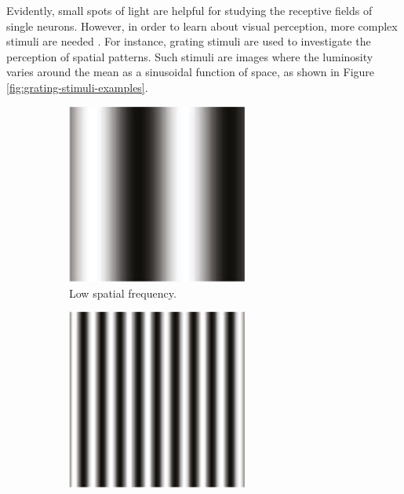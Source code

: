 Evidently, small spots of light are helpful for studying the receptive fields of single neurons. However, in order to learn about visual perception, more complex stimuli are needed \cite{KandelBook2003:26}. For instance, grating stimuli are used to investigate the perception of spatial patterns. Such stimuli are images where the luminosity varies around the mean as a sinusoidal function of space, as shown in Figure \ref{fig:grating-stimuli-examples}.
\begin{figure}[!htp]
    \centering
    \begin{subfigure}[t]{0.3\textwidth}
        \centering
        \includegraphics[width=0.65\textwidth]{assets/images/grating-stimuli/1.png}
        \caption{{Low spatial frequency.}}
    \end{subfigure}
    \hspace{0.03\textwidth}
    \begin{subfigure}[t]{0.3\textwidth}
        \centering
        \includegraphics[width=0.65\textwidth]{assets/images/grating-stimuli/2.png}

\end{subfigure}
\end{figure}
